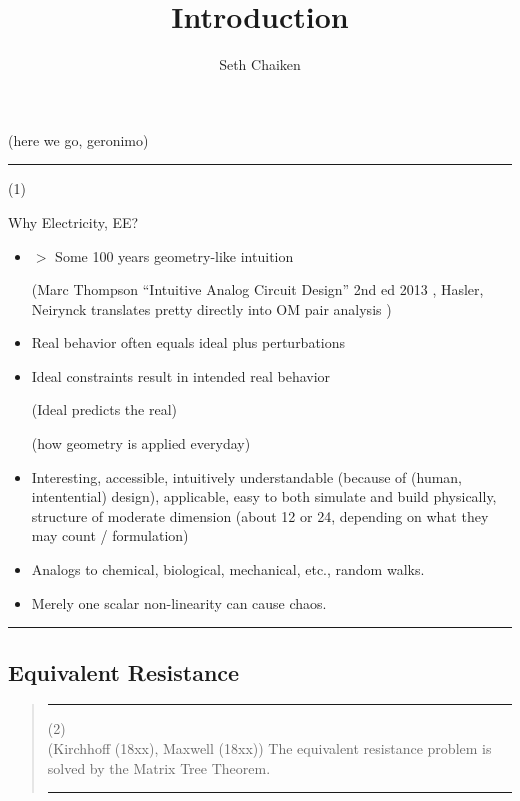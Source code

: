 \documentclass{article}
\title{Introduction}
\author{Seth Chaiken}
\begin{document}
\maketitle

(here we go, geronimo)


\rule{\textwidth}{3pt}
(1)








Why Electricity, EE?
\begin{itemize}
\item $>$ Some 100 years geometry-like intuition

(Marc Thompson ``Intuitive Analog Circuit Design'' 2nd ed 2013
\cite{intuitAna}, Hasler, Neirynck translates pretty directly into
OM pair analysis \cite{HaslerNeirynck})



\item
Real behavior often equals ideal plus perturbations

\item
Ideal constraints result in intended real behavior

(Ideal predicts the real)

(how geometry is applied everyday)

\item 
Interesting, accessible, intuitively understandable
(because of (human, intentential) design), applicable,
easy to both simulate and build physically, structure of moderate
dimension (about 12 or 24, depending on what they may count / formulation)
\item
Analogs to chemical, biological, mechanical, etc., random walks.
\item
Merely one scalar non-linearity can cause chaos.
\end{itemize}
\rule{\textwidth}{3pt}

\subsection{Equivalent Resistance}




\pagebreak[3] \begin{quote}\rule{\textwidth}{3pt}
(2)\\
(Kirchhoff (18xx), Maxwell (18xx)) The equivalent resistance problem
is solved by
the Matrix Tree Theorem.
 
\rule{\textwidth}{3pt}
\end{quote}
\end{document}
